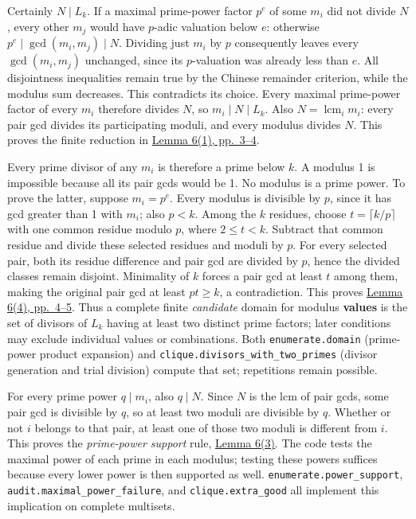 \documentclass[11pt,a4paper]{article}
\begin{document}
Certainly \(N\mid L_k\). If a maximal prime-power factor \(p^e\) of some \(m_i\) did not divide \(N\), every other \(m_j\) would have \(p\)-adic valuation below \(e\): otherwise \(p^e\mid\gcd(m_i,m_j)\mid N\). Dividing just \(m_i\) by \(p\) consequently leaves every \(\gcd(m_i,m_j)\) unchanged, since its \(p\)-valuation was already less than \(e\). All disjointness inequalities remain true by the Chinese remainder criterion, while the modulus sum decreases. This contradicts its choice. Every maximal prime-power factor of every \(m_i\) therefore divides \(N\), so \(m_i\mid N\mid L_k\). Also \(N=\operatorname{lcm}_i m_i\): every pair gcd divides its participating moduli, and every modulus divides \(N\). This proves the finite reduction in \href{https://arxiv.org/pdf/math/0604347v2}{Lemma 6(1), pp.~3--4}.

Every prime divisor of any \(m_i\) is therefore a prime below \(k\). A modulus 1 is impossible because all its pair gcds would be 1. No modulus is a prime power. To prove the latter, suppose \(m_i=p^e\). Every modulus is divisible by \(p\), since it has gcd greater than 1 with \(m_i\); also \(p<k\). Among the \(k\) residues, choose \(t=\lceil k/p\rceil\) with one common residue modulo \(p\), where \(2\le t<k\). Subtract that common residue and divide these selected residues and moduli by \(p\). For every selected pair, both its residue difference and pair gcd are divided by \(p\), hence the divided classes remain disjoint. Minimality of \(k\) forces a pair gcd at least \(t\) among them, making the original pair gcd at least \(pt\ge k\), a contradiction. This proves \href{https://arxiv.org/pdf/math/0604347v2}{Lemma 6(4), pp.~4--5}. Thus a complete finite \emph{candidate} domain for modulus \textbf{values} is the set of divisors of \(L_k\) having at least two distinct prime factors; later conditions may exclude individual values or combinations. Both \texttt{enumerate.domain} (prime-power product expansion) and \texttt{clique.divisors\_with\_two\_primes} (divisor generation and trial division) compute that set; repetitions remain possible.

For every prime power \(q\mid m_i\), also \(q\mid N\). Since \(N\) is the lcm of pair gcds, some pair gcd is divisible by \(q\), so at least two moduli are divisible by \(q\). Whether or not \(i\) belongs to that pair, at least one of those two moduli is different from \(i\). This proves the \emph{prime-power support} rule, \href{https://arxiv.org/pdf/math/0604347v2}{Lemma 6(3)}. The code tests the maximal power of each prime in each modulus; testing these powers suffices because every lower power is then supported as well. \texttt{enumerate.power\_support}, \texttt{audit.maximal\_power\_failure}, and \texttt{clique.extra\_good} all implement this implication on complete multisets.
\end{document}
